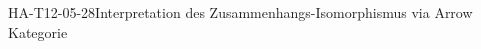 
\begin{STUD}{HA-T12-05-28}{Interpretation des Zusammenhangs-Isomorphismus via Arrow Kategorie}
\end{STUD}
